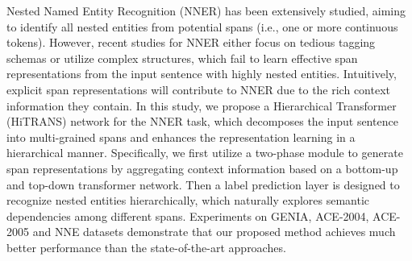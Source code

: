 Nested Named Entity Recognition (NNER) has been extensively studied, aiming to identify all nested entities from potential spans (i.e., one or more continuous tokens). However, recent studies for NNER either focus on tedious tagging schemas or utilize complex structures, which fail to learn effective span representations from the input sentence with highly nested entities. Intuitively, explicit span representations will contribute to NNER due to the rich context information they contain. In this study, we propose a Hierarchical Transformer (HiTRANS) network for the NNER task, which decomposes the input sentence into multi-grained spans and enhances the representation learning in a hierarchical manner. Specifically, we first utilize a two-phase module to generate span representations by aggregating context information based on a bottom-up and top-down transformer network. Then a label prediction layer is designed to recognize nested entities hierarchically, which naturally explores semantic dependencies among different spans. Experiments on GENIA, ACE-2004, ACE-2005 and NNE datasets demonstrate that our proposed method achieves much better performance than the state-of-the-art approaches.
